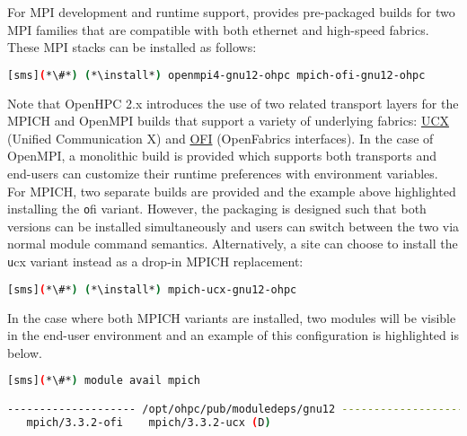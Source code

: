 For MPI development and runtime support, \OHPC{} provides pre-packaged builds
for two MPI families that are compatible with both ethernet and high-speed
fabrics.  These MPI stacks can be installed as follows:

\begin{lstlisting}[language=bash]
[sms](*\#*) (*\install*) openmpi4-gnu12-ohpc mpich-ofi-gnu12-ohpc
\end{lstlisting}

Note that OpenHPC 2.x introduces the use of two related transport layers for
the MPICH and OpenMPI builds that support a variety of underlying
fabrics: \href{https://www.openucx.org}{UCX} (Unified Communication X)
and \href{https://ofiwg.github.io/libfabric/}{OFI} (OpenFabrics interfaces).
In the case of OpenMPI, a monolithic build is provided which supports both
transports and end-users can customize their runtime preferences with
environment variables. For MPICH, two separate builds are provided and the
example above highlighted installing the {\texttt ofi} variant.  However, the
packaging is designed such that both versions can be installed simultaneously
and users can switch between the two via normal module command
semantics. Alternatively, a site can choose to install the {\texttt ucx} variant
instead as a drop-in MPICH replacement:

\begin{lstlisting}[language=bash]
[sms](*\#*) (*\install*) mpich-ucx-gnu12-ohpc
\end{lstlisting}

In the case where both MPICH variants are installed, two modules will be
visible in the end-user environment and an example of this configuration is
highlighted is below. 

\begin{lstlisting}[language=bash]
[sms](*\#*) module avail mpich

-------------------- /opt/ohpc/pub/moduledeps/gnu12 ---------------------
   mpich/3.3.2-ofi    mpich/3.3.2-ucx (D)
\end{lstlisting}





